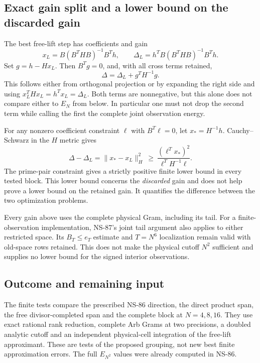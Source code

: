 \subsection{Exact gain split and a lower bound on the discarded gain}
The best free-lift step has coefficients and gain
\[
 x_L=B(B^THB)^{-1}B^Th,\qquad
 \Delta_L=h^TB(B^THB)^{-1}B^Th.
\]
Set $g=h-Hx_L$. Then $B^Tg=0$, and, with all cross terms retained,
\begin{equation}
 \Delta=\Delta_L+g^TH^{-1}g.
 \label{eq:ns95-exact-split}
\end{equation}
This follows either from orthogonal projection or by expanding the
right side and using $x_L^THx_L=h^Tx_L=\Delta_L$.
Both terms are nonnegative, but this alone does not compare either
to $E_N$ from below. In particular one must not drop the second term
while calling the first the complete joint observation energy.

For any nonzero coefficient constraint $\ell$ with $B^T\ell=0$, let
$x_*=H^{-1}h$. Cauchy--Schwarz in the $H$ metric gives
\begin{equation}
 \Delta-\Delta_L
 =\|x_*-x_L\|_H^2
 \ \ge\ \frac{(\ell^Tx_*)^2}{\ell^TH^{-1}\ell}.
 \label{eq:ns95-loss}
\end{equation}
The prime-pair constraint gives a strictly positive finite lower bound
in every tested block. This lower bound concerns the \emph{discarded}
gain and does not help prove a lower bound on the retained gain. It
quantifies the difference between the two optimization problems.

Every gain above uses the complete physical Gram, including its tail.
For a finite-observation implementation, NS-87's joint tail argument
also applies to either restricted space. Its $B_T\le e_T$ estimate
and $T=N^6$ localization remain valid with old-space rows retained.
This does not make the physical cutoff $N^2$ sufficient and supplies
no lower bound for the signed interior observations.

\subsection{Outcome and remaining input}
The finite tests compare the prescribed NS-86 direction, the direct
product span, the free divisor-completed span and the complete block
at $N=4,8,16$. They use exact rational rank reduction, complete Arb
Grams at two precisions, a doubled analytic cutoff and an independent
physical-cell integration of the free-lift approximant. These are tests
of the proposed grouping, not new best finite approximation errors.
The full $E_{N^2}$ values were already computed in NS-86.

